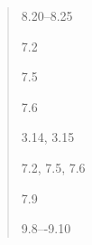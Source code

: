 \documentclass[12pt]{extarticle}
\begin{document}
\begin{multicols*}{3}
\begin{minipage}{\columnwidth}
\begin{quote}
8.20--8.25
 
7.2
 
7.5
 
7.6
 
3.14, 3.15
 
7.2, 7.5, 7.6
 
7.9
 
9.8–-9.10
 
\end{quote}
\end{minipage}


 

\end{multicols*}
\end{document}
